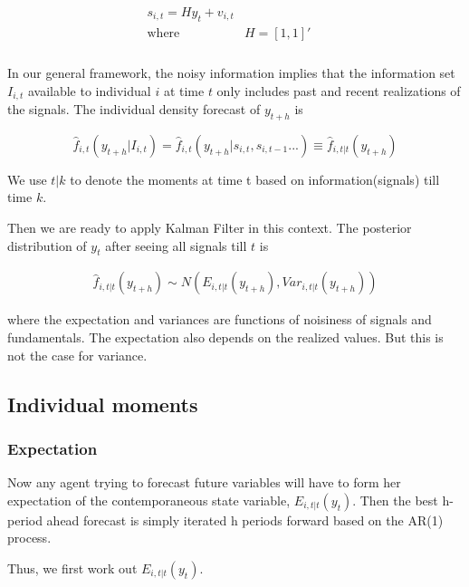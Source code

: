 \documentclass[]{article}
\begin{document}
\begin{eqnarray}
\begin{aligned}
s_{i,t} = H y_{t} + v_{i,t} \\
\text{where } & H=[1,1]' \quad \\
\end{aligned}
\end{eqnarray}


In our general framework, the noisy information implies that the information set $I_{i,t}$ available to individual $i$ at time $t$ only includes past and recent realizations of the signals. The individual density forecast of $y_{t+h}$ is

$$\widehat f_{i,t}(y_{t+h}|I_{i,t}) = \widehat  f_{i,t}(y_{t+h}|s_{i,t},s_{i,t-1}...) \equiv \widehat  f_{i,t|t}(y_{t+h})$$


We use $t|k$ to denote the moments at time t based on information(signals) till time $k$. 


Then we are ready to apply Kalman Filter in this context. The posterior distribution of $y_{t}$ after seeing all signals till $t$ is 

\begin{eqnarray}
\widehat  f_{i,t|t}(y_{t+h})  \sim  N(E_{i,t|t}(y_{t+h}), Var_{i,t|t}(y_{t+h}))
\end{eqnarray}

where the expectation and variances are functions of noisiness of signals and fundamentals. The expectation also depends on the realized values. But this is not the case for variance. 

\subsection{Individual moments }

\subsubsection{Expectation}

Now any agent trying to forecast future variables will have to form her expectation of the contemporaneous state variable, $E_{i,t|t}(y_t)$. Then the best h-period ahead forecast is simply iterated h periods forward based on the AR(1) process.  

Thus, we first work out $E_{i,t|t}(y_t)$.  
\end{document}
